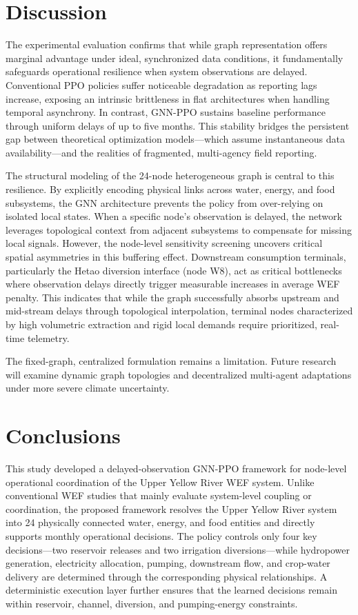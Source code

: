 \documentclass [a4paper,fleqn] {cas-dc}
\begin{document}
\section{Discussion} \label{sec5}

The experimental evaluation confirms that while graph representation offers marginal advantage under ideal, synchronized data conditions, it fundamentally safeguards operational resilience when system observations are delayed. Conventional PPO policies suffer noticeable degradation as reporting lags increase, exposing an intrinsic brittleness in flat architectures when handling temporal asynchrony. In contrast, GNN-PPO sustains baseline performance through uniform delays of up to five months. This stability bridges the persistent gap between theoretical optimization models—which assume instantaneous data availability—and the realities of fragmented, multi-agency field reporting.  

The structural modeling of the 24-node heterogeneous graph is central to this resilience. By explicitly encoding physical links across water, energy, and food subsystems, the GNN architecture prevents the policy from over-relying on isolated local states. When a specific node's observation is delayed, the network leverages topological context from adjacent subsystems to compensate for missing local signals. However, the node-level sensitivity screening uncovers critical spatial asymmetries in this buffering effect. Downstream consumption terminals, particularly the Hetao diversion interface (node W8), act as critical bottlenecks where observation delays directly trigger measurable increases in average WEF penalty. This indicates that while the graph successfully absorbs upstream and mid-stream delays through topological interpolation, terminal nodes characterized by high volumetric extraction and rigid local demands require prioritized, real-time telemetry.  

The fixed-graph, centralized formulation remains a limitation. Future research will examine dynamic graph topologies and decentralized multi-agent adaptations under more severe climate uncertainty.

\section{Conclusions} 
\label{sec6}

This study developed a delayed-observation GNN-PPO framework for node-level operational coordination of the Upper Yellow River WEF system. Unlike conventional WEF studies that mainly evaluate system-level coupling or coordination, the proposed framework resolves the Upper Yellow River system into 24 physically connected water, energy, and food entities and directly supports monthly operational decisions. The policy controls only four key decisions—two reservoir releases and two irrigation diversions—while hydropower generation, electricity allocation, pumping, downstream flow, and crop-water delivery are determined through the corresponding physical relationships. A deterministic execution layer further ensures that the learned decisions remain within reservoir, channel, diversion, and pumping-energy constraints.
\end{document}
